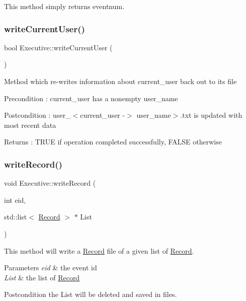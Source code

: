 This method simply returns eventnum. \mbox{\label{class_executive_a5879f0c70a947b199113f1d707c53610}} 
\subsubsection{\texorpdfstring{write\+Current\+User()}{writeCurrentUser()}}
{\footnotesize\ttfamily bool Executive\+::write\+Current\+User (\begin{DoxyParamCaption}{ }\end{DoxyParamCaption})}

Method which re-\/writes information about current\+\_\+user back out to it\textquotesingle{}s file \begin{DoxyPrecond}{Precondition}
\+: current\+\_\+user has a nonempty user\+\_\+name 
\end{DoxyPrecond}
\begin{DoxyPostcond}{Postcondition}
\+: user\+\_\+$<$current\+\_\+user -\/$>$ user\+\_\+name$>$.txt is updated with most recent data 
\end{DoxyPostcond}
\begin{DoxyReturn}{Returns}
\+: T\+R\+UE if operation completed successfully, F\+A\+L\+SE otherwise 
\end{DoxyReturn}
\mbox{\label{class_executive_a32e7d63d1978cef1db5bd55f085aa137}} 
\subsubsection{\texorpdfstring{write\+Record()}{writeRecord()}}
{\footnotesize\ttfamily void Executive\+::write\+Record (\begin{DoxyParamCaption}\item[{int}]{eid,  }\item[{std\+::list$<$ \mbox{\hyperlink{class_record}{Record}} $>$ $\ast$}]{List }\end{DoxyParamCaption})}

This method will write a \mbox{\hyperlink{class_record}{Record}} file of a given list of \mbox{\hyperlink{class_record}{Record}}. 
\begin{DoxyParams}{Parameters}
{\em eid} & the event id \\
\hline
{\em List} & the list of \mbox{\hyperlink{class_record}{Record}} \\
\hline
\end{DoxyParams}
\begin{DoxyPostcond}{Postcondition}
the List will be deleted and saved in files. 
\end{DoxyPostcond}
\mbox{\label{class_executive_aa717a460eec1cdfe11808611dd8aeb8e}} 
